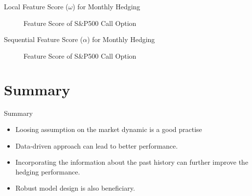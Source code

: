 \documentclass[10pt,table,mathserif]{beamer}
\begin{document}
\begin{frame}[fragile]{Local Feature Score ($\omega$) for Monthly Hedging}
\begin{figure}[htp]
  \centering
  \caption{Feature Score of S\&P500 Call Option} \label{fig:call1}
\end{figure}
\end{frame}


\begin{frame}[fragile]{Sequential Feature Score ($\alpha$) for Monthly Hedging}
\begin{figure}[htp]
  \centering
  \caption{Feature Score of S\&P500 Call Option} \label{fig:call1}
\end{figure}
\end{frame}




\section{Summary}
\begin{frame}[fragile]{Summary}
\begin{itemize}
  \item Loosing assumption on the market dynamic is a good practise
  \item Data-driven approach can lead to better performance.
  \item Incorporating the information about the past history can further improve the hedging performance.
  \item Robust model design is also beneficiary.
\end{itemize}
\end{frame}
\end{document}
